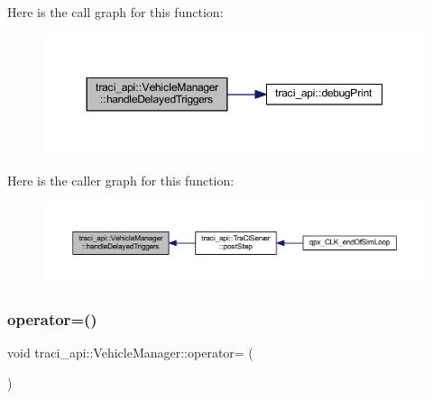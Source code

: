 Here is the call graph for this function\+:\nopagebreak
\begin{figure}[H]
\begin{center}
\leavevmode
\includegraphics[width=350pt]{classtraci__api_1_1_vehicle_manager_a4e656c9c9b434113e01331cf0b84babc_cgraph}
\end{center}
\end{figure}
Here is the caller graph for this function\+:\nopagebreak
\begin{figure}[H]
\begin{center}
\leavevmode
\includegraphics[width=350pt]{classtraci__api_1_1_vehicle_manager_a4e656c9c9b434113e01331cf0b84babc_icgraph}
\end{center}
\end{figure}
\mbox{\label{classtraci__api_1_1_vehicle_manager_a3e5ca16c51d63faee6a3a9eb3a4ffafa}} 
\subsubsection{\texorpdfstring{operator=()}{operator=()}}
{\footnotesize\ttfamily void traci\+\_\+api\+::\+Vehicle\+Manager\+::operator= (\begin{DoxyParamCaption}\item[{\hyperlink{classtraci__api_1_1_vehicle_manager}{Vehicle\+Manager} const \&}]{ }\end{DoxyParamCaption})\hspace{0.3cm}{\ttfamily [delete]}}

\mbox{\label{classtraci__api_1_1_vehicle_manager_a4b246d7f01b5f37679830f677328fc16}} 
